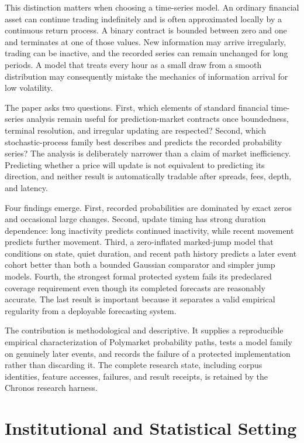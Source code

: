 \documentclass[11pt]{article}
\begin{document}
This distinction matters when choosing a time-series model. An ordinary financial asset can
continue trading indefinitely and is often approximated locally by a continuous return process.
A binary contract is bounded between zero and one and terminates at one of those values. New
information may arrive irregularly, trading can be inactive, and the recorded series can remain
unchanged for long periods. A model that treats every hour as a small draw from a smooth
distribution may consequently mistake the mechanics of information arrival for low volatility.

The paper asks two questions. First, which elements of standard financial time-series analysis
remain useful for prediction-market contracts once boundedness, terminal resolution, and
irregular updating are respected? Second, which stochastic-process family best describes and
predicts the recorded probability series? The analysis is deliberately narrower than a claim of
market inefficiency. Predicting whether a price will update is not equivalent to predicting its
direction, and neither result is automatically tradable after spreads, fees, depth, and latency.

Four findings emerge. First, recorded probabilities are dominated by exact zeros and occasional
large changes. Second, update timing has strong duration dependence: long inactivity predicts
continued inactivity, while recent movement predicts further movement. Third, a zero-inflated
marked-jump model that conditions on state, quiet duration, and recent path history predicts a
later event cohort better than both a bounded Gaussian comparator and simpler jump models.
Fourth, the strongest formal protected system fails its predeclared coverage requirement even
though its completed forecasts are reasonably accurate. The last result is important because it
separates a valid empirical regularity from a deployable forecasting system.

The contribution is methodological and descriptive. It supplies a reproducible empirical
characterization of Polymarket probability paths, tests a model family on genuinely later events,
and records the failure of a protected implementation rather than discarding it. The complete
research state, including corpus identities, feature accesses, failures, and result receipts, is
retained by the Chronos research harness.

\section{Institutional and Statistical Setting}
\end{document}

